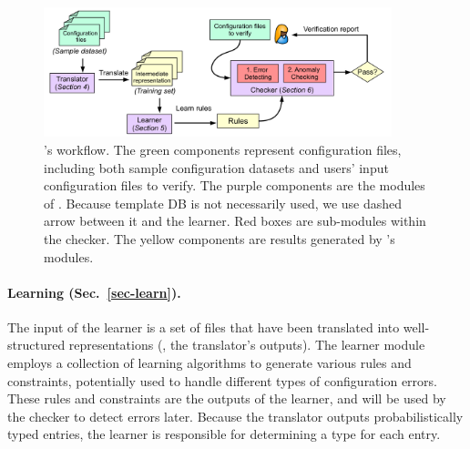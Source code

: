 \begin{figure}[tbp] \centering
\includegraphics[width=0.9\textwidth]{figs/overview}
\caption{\app's workflow. The green components represent configuration 
  files, including both sample configuration datasets and users' input
  configuration files to verify. 
  The purple components are the modules of \app.
  Because template DB is not necessarily used, we use dashed
  arrow between it and the learner.
  Red boxes are sub-modules within the checker.
  The yellow components are results generated by \app's modules.}
\label{fig-overview}
\end{figure}

\paragraph{Learning (Sec.~\ref{sec-learn}).}
The input of the learner is a set of files that have been translated
into well-structured representations (\ie, the translator's
outputs). The learner module employs a collection of learning algorithms
to generate various rules and constraints,
potentially used to handle different types of configuration errors.
These rules and constraints are the outputs of the learner, 
and will be used by the checker to detect errors later.
Because the translator outputs probabilistically typed entries,
the learner is responsible for determining a type for each entry.


